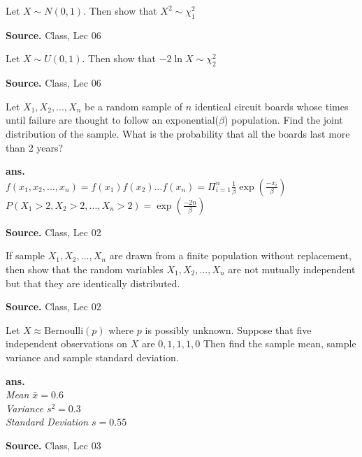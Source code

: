 \documentclass[12pt,twoside]{report}
\newenvironment*{ans}{\textbf{ans.}\space\em\\}{\par}
\newenvironment*{source}{\hfill\scriptsize\textbf{Source.}\space}{\par}
\begin{document}
\begin{samepage}
\begin{ex}
Let $X \sim N(0,1)$. Then show that $X^2 \sim \chi_1^2$
\end{ex}
\begin{source}
Class, Lec 06
\end{source}
\end{samepage}

\begin{samepage}
\begin{ex}
Let $X \sim U(0,1)$. Then show that $-2 \ln X \sim \chi^2_2$
\end{ex}
\begin{source}
Class, Lec 06
\end{source}
\end{samepage}

\begin{ex}
Let $X_1, X_2, ..., X_n$ be a random sample of $n$ identical circuit boards whose times until failure are thought to follow an exponential($\beta$) population. Find the joint distribution of the sample. What is the probability that all the boards last more than 2 years?
\end{ex}
\begin{ans}
$f(x_1, x_2, ..., x_n)  = f(x_1) f(x_2) ... f(x_n) = \Pi_{i=1}^n \frac{1}{\beta} \exp(\frac{-x_i}{\beta})$ \\
$P(X_1 > 2, X_2 > 2, ..., X_n > 2) = \exp(\frac{-2n}{\beta})$
\end{ans}
\begin{source}
    Class, Lec 02
\end{source}

\begin{ex}
If sample $X_1, X_2, ..., X_n$ are drawn from  a finite population without replacement, then show that the random variables $X_1, X_2, ...,X_n$ are not mutually independent but that they are identically distributed.
\end{ex}
\begin{source}
Class, Lec 02 
\end{source}

\begin{samepage}
\begin{ex}
Let $X \approx \text{Bernoulli}\left (p\right )$ where $p$ is possibly unknown. Suppose that five independent observations on $X$ are $0,1,1,1,0$ Then find the sample mean, sample variance and sample standard deviation.
\end{ex}
\begin{ans}
Mean $\bar{x} = 0.6$\\
Variance $s^2 = 0.3$ \\
Standard Deviation $s = 0.55$ 
\end{ans}
\begin{source}
Class, Lec 03
\end{source}
\end{samepage}
\end{document}
